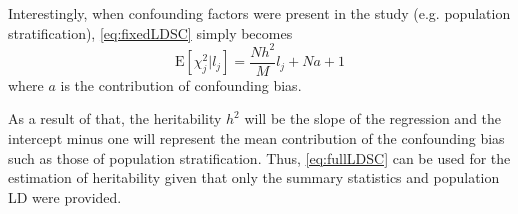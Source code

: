 	Interestingly, when confounding factors were present in the study (e.g. population stratification), \cref{eq:fixedLDSC} simply becomes
	\begin{equation}
	\mathrm{E}[\chi^2_j | l_j] = \frac{Nh^2}{M}l_j+Na+1
	\label{eq:fullLDSC}
	\end{equation}
	where $a$ is the contribution of confounding bias.
	
	
	As a result of that, the heritability $h^2$ will be the slope of the regression and the intercept minus one will represent the mean contribution of the confounding bias such as those of population stratification. 
	Thus, \cref{eq:fullLDSC} can be used for the estimation of heritability given that only the summary statistics and population \gls{LD} were provided. 
	
